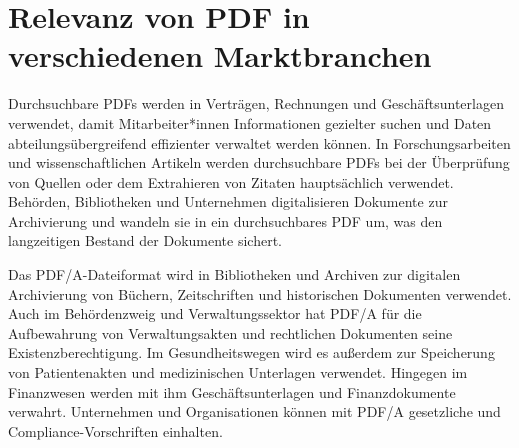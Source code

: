 \section{Relevanz von PDF in verschiedenen Marktbranchen}
Durchsuchbare PDFs werden in Verträgen, Rechnungen und Geschäftsunterlagen verwendet, damit Mitarbeiter*innen Informationen gezielter suchen und Daten abteilungsübergreifend effizienter verwaltet werden können. In Forschungsarbeiten und wissenschaftlichen Artikeln werden durchsuchbare PDFs bei der Überprüfung von Quellen oder dem Extrahieren von Zitaten hauptsächlich verwendet. Behörden, Bibliotheken und Unternehmen digitalisieren Dokumente zur Archivierung und wandeln sie in ein durchsuchbares PDF um, was den langzeitigen Bestand der Dokumente sichert. \cite{adobe-search}

Das PDF/A-Dateiformat wird in Bibliotheken und Archiven zur digitalen Archivierung von Büchern, Zeitschriften und historischen Dokumenten verwendet. Auch im Behördenzweig und Verwaltungssektor hat PDF/A für die Aufbewahrung von Verwaltungsakten und rechtlichen Dokumenten seine Existenzberechtigung. Im Gesundheitswegen wird es außerdem zur Speicherung von Patientenakten und medizinischen Unterlagen verwendet. Hingegen im Finanzwesen werden mit ihm Geschäftsunterlagen und Finanzdokumente verwahrt. Unternehmen und Organisationen können mit PDF/A gesetzliche und Compliance-Vorschriften einhalten. \cite{adobe-pdf-a}
